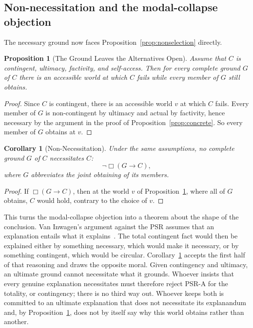 \documentclass[11pt,letterpaper]{article}
\theoremstyle{plain}
\newtheorem{proposition}{Proposition}
\newtheorem{corollary}{Corollary}
\theoremstyle{definition}
\begin{document}
\subsection{Non-necessitation and the modal-collapse objection}
\label{sec:nonnec}

The necessary ground now faces Proposition~\ref{prop:nonselection} directly.

\begin{proposition}[The Ground Leaves the Alternatives Open]\label{prop:open}
Assume that $C$ is contingent, ultimacy, factivity, and self-access. Then for every complete ground $G$ of $C$ there is an accessible world at which $C$ fails while every member of $G$ still obtains.
\end{proposition}

\begin{proof}
Since $C$ is contingent, there is an accessible world $v$ at which $C$ fails. Every member of $G$ is non-contingent by ultimacy and actual by factivity, hence necessary by the argument in the proof of Proposition~\ref{prop:concrete}. So every member of $G$ obtains at $v$.
\end{proof}

\begin{corollary}[Non-Necessitation]\label{cor:nonnec}
Under the same assumptions, no complete ground $G$ of $C$ necessitates $C$:
\[
  \neg\Box(G \to C),
\]
where $G$ abbreviates the joint obtaining of its members.
\end{corollary}

\begin{proof}
If $\Box(G \to C)$, then at the world $v$ of Proposition~\ref{prop:open}, where all of $G$ obtains, $C$ would hold, contrary to the choice of $v$.
\end{proof}

This turns the modal-collapse objection into a theorem about the shape of the conclusion. Van Inwagen's argument against the PSR assumes that an explanation entails what it explains~\cite{vaninwagen}. The total contingent fact would then be explained either by something necessary, which would make it necessary, or by something contingent, which would be circular. Corollary~\ref{cor:nonnec} accepts the first half of that reasoning and draws the opposite moral. Given contingency and ultimacy, an ultimate ground cannot necessitate what it grounds. Whoever insists that every genuine explanation necessitates must therefore reject PSR-A for the totality, or contingency; there is no third way out. Whoever keeps both is committed to an ultimate explanation that does not necessitate its explanandum and, by Proposition~\ref{prop:open}, does not by itself say why this world obtains rather than another.
\end{document}
